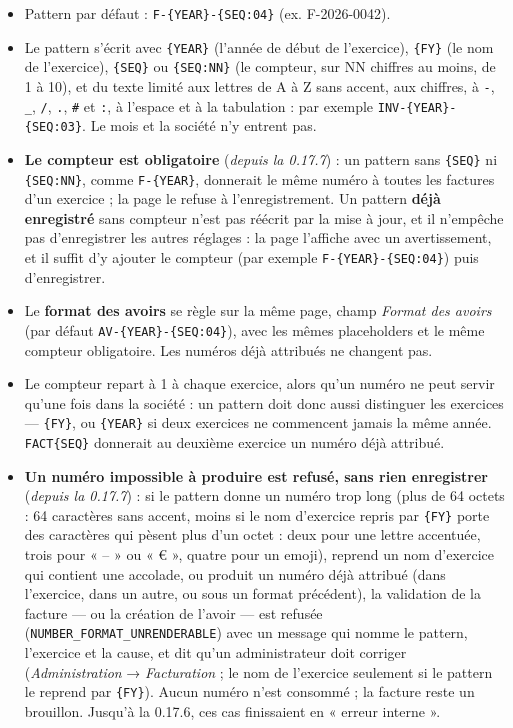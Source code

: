 \documentclass[a4paper,11pt,oneside]{article}
\begin{document}
\begin{itemize}
    \item Pattern par défaut : \texttt{F-\{YEAR\}-\{SEQ:04\}} (ex. F-2026-0042).
    \item Le pattern s'écrit avec \texttt{\{YEAR\}} (l'année de début de l'exercice), \texttt{\{FY\}} (le nom de l'exercice), \texttt{\{SEQ\}} ou \texttt{\{SEQ:NN\}} (le compteur, sur NN chiffres au moins, de 1 à 10), et du texte limité aux lettres de A à Z sans accent, aux chiffres, à \texttt{-}, \texttt{\_}, \texttt{/}, \texttt{.}, \texttt{\#} et \texttt{:}, à l'espace et à la tabulation : par exemple \texttt{INV-\{YEAR\}-\{SEQ:03\}}. Le mois et la société n'y entrent pas.
    \item \textbf{Le compteur est obligatoire} (\emph{depuis la 0.17.7}) : un pattern sans \texttt{\{SEQ\}} ni \texttt{\{SEQ:NN\}}, comme \texttt{F-\{YEAR\}}, donnerait le même numéro à toutes les factures d'un exercice ; la page le refuse à l'enregistrement. Un pattern \textbf{déjà enregistré} sans compteur n'est pas réécrit par la mise à jour, et il n'empêche pas d'enregistrer les autres réglages : la page l'affiche avec un avertissement, et il suffit d'y ajouter le compteur (par exemple \texttt{F-\{YEAR\}-\{SEQ:04\}}) puis d'enregistrer.
    \item Le \textbf{format des avoirs} se règle sur la même page, champ \emph{Format des avoirs} (par défaut \texttt{AV-\{YEAR\}-\{SEQ:04\}}), avec les mêmes placeholders et le même compteur obligatoire. Les numéros déjà attribués ne changent pas.
    \item Le compteur repart à 1 à chaque exercice, alors qu'un numéro ne peut servir qu'une fois dans la société : un pattern doit donc aussi distinguer les exercices --- \texttt{\{FY\}}, ou \texttt{\{YEAR\}} si deux exercices ne commencent jamais la même année. \texttt{FACT\{SEQ\}} donnerait au deuxième exercice un numéro déjà attribué.
    \item \textbf{Un numéro impossible à produire est refusé, sans rien enregistrer} (\emph{depuis la 0.17.7}) : si le pattern donne un numéro trop long (plus de 64 octets : 64 caractères sans accent, moins si le nom d'exercice repris par \texttt{\{FY\}} porte des caractères qui pèsent plus d'un octet : deux pour une lettre accentuée, trois pour « – » ou « € », quatre pour un emoji), reprend un nom d'exercice qui contient une accolade, ou produit un numéro déjà attribué (dans l'exercice, dans un autre, ou sous un format précédent), la validation de la facture --- ou la création de l'avoir --- est refusée (\texttt{NUMBER\_FORMAT\_\allowbreak UNRENDERABLE}) avec un message qui nomme le pattern, l'exercice et la cause, et dit qu'un administrateur doit corriger (\emph{Administration} → \emph{Facturation} ; le nom de l'exercice seulement si le pattern le reprend par \texttt{\{FY\}}). Aucun numéro n'est consommé ; la facture reste un brouillon. Jusqu'à la 0.17.6, ces cas finissaient en « erreur interne ».

\end{itemize}
\end{document}
